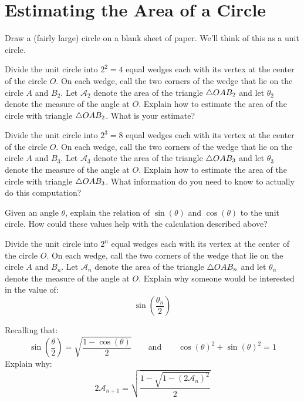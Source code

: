 \newpage
\section{Estimating the Area of a Circle}


Draw a (fairly large) circle on a blank sheet of paper. We'll think of
this as a unit circle.


\begin{prob}
Divide the unit circle into $2^2 = 4$ equal wedges each with its vertex at
the center of the circle $O$.  On each wedge, call the two corners of
the wedge that lie on the circle $A$ and $B_2$.  Let $\mathcal{A}_2$
denote the area of the triangle $\triangle OAB_2$ and let $\theta_2$ denote the
measure of the angle at $O$. Explain how to estimate the area of the
circle with triangle $\triangle OAB_2$. What is your estimate?
\end{prob}

\begin{prob}
Divide the unit circle into $2^3 = 8$ equal wedges each with its vertex at
the center of the circle $O$.  On each wedge, call the two corners of
the wedge that lie on the circle $A$ and $B_3$.  Let $\mathcal{A}_3$
denote the area of the triangle $\triangle OAB_3$ and let $\theta_3$
denote the measure of the angle at $O$. Explain how to estimate the
area of the circle with triangle $\triangle OAB_3$. What information do
you need to know to actually do this computation?
\end{prob}

\begin{prob}
Given an angle $\theta$, explain the relation of $\sin(\theta)$ and
$\cos(\theta)$ to the unit circle. How could these values help with
the calculation described above?
\end{prob}

\begin{prob}
Divide the unit circle into $2^n$ equal wedges each with its vertex at
the center of the circle $O$.  On each wedge, call the two corners of
the wedge that lie on the circle $A$ and $B_n$.  Let $\mathcal{A}_n$
denote the area of the triangle $\triangle OAB_n$ and let $\theta_n$
denote the measure of the angle at $O$. Explain why someone would be
interested in the value of:
\[
\sin\left(\frac{\theta_n}{2}\right)
\]
\end{prob}

\begin{prob}
Recalling that:
\[
\sin\left(\frac{\theta}{2}\right) = \sqrt{\frac{1-\cos(\theta)}{2}}
\qquad\text{and}\qquad
\cos(\theta)^2 + \sin(\theta)^2 = 1
\]
Explain why:
\[
2 \mathcal{A}_{n+1} = \sqrt{\frac{1 - \sqrt{1 - (2\mathcal{A}_n)^2}}{2}}
\]
\end{prob}


